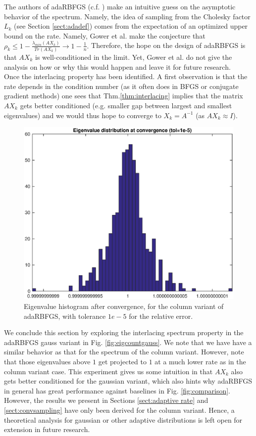 \documentclass[12pt,conference,compsocconf]{IEEEtran}
\begin{document}
The authors of adaRBFGS (c.f. \cite{Gower1}) make an intuitive guess on the asymptotic behavior of the spectrum. Namely, the idea of sampling from the Cholesky factor $L_k$ (see Section \ref{sect:adadef}) comes from the expectation of an optimized upper bound on the rate. Namely, Gower et al. make the conjecture that $\rho_k \leq 1- \frac{\lambda_{min}(AX_k)}{Tr(AX_k)}\rightarrow 1 - \frac{1}{n}.$ Therefore, the hope on the design of adaRBFGS is that $AX_k$ is well-conditioned in the limit. Yet, Gower et al. do not give the analysis on how or why this would happen and leave it for future research.\\
Once the interlacing property has been identified. A first observation is that the rate depends in the condition number (as it often does in BFGS or conjugate gradient methods) one sees that Thm.\ref{thm:interlacing} implies that the matrix $AX_k$ gets better conditioned (e.g. smaller gap between largest and smallest eigenvalues) and we would thus hope to converge to $X_k=A^{-1}$ (as $AX_k\approx I$).
\begin{figure}[H]
  \centering
  \includegraphics[height=0.7\columnwidth,width=1.0\columnwidth]{eigditstol5.eps}
  
  \vspace{-2mm}
  \caption{Eigenvalue histogram after convergence, for the column variant of adaRBFGS, with tolerance $1e-5$ for the relative error. \label{fig:eighist5}}  
  
\end{figure}

We conclude this section by exploring the interlacing spectrum property in the adaRBFGS gauss variant in Fig. \ref{fig:eigcountgauss}. We note that we have have a similar behavior as that for the spectrum of the column variant. However, note that those eigenvalues above $1$ get projected to $1$ at a much lower rate as in the column variant case. This experiment gives us some intuition in that $AX_k$ also gets better conditioned for the gaussian variant, which also hints why adaRBFGS in general has great performance against baselines in Fig. \ref{fig:comparison}. However, the results we present in Sections \ref{sect:adaptive rate} and \ref{sect:convsampling} have only been derived for the column variant. Hence, a theoretical analysis for gaussian or other adaptive distributions is left open for extension in future research.
\end{document}
